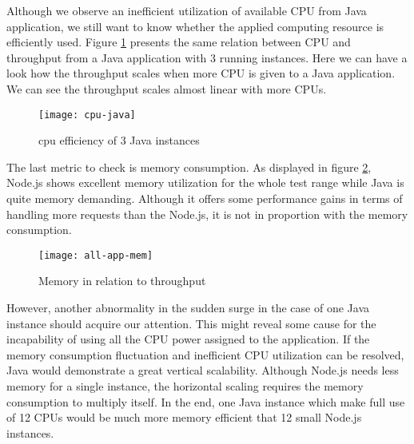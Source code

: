 Although we observe an inefficient utilization of available CPU from Java application, we still want to know whether the applied computing resource is efficiently used. Figure \ref{cpu-java} presents the same relation between CPU and throughput from a Java application with 3 running instances. Here we can have a look how the throughput scales when more CPU is given to a Java application. We can see the throughput scales almost linear with more CPUs.
 \begin{figure}[h]
	\centering
	\texttt{[image: cpu-java]}
	\caption{cpu efficiency of 3 Java instances}
	\label{cpu-java}
\end{figure}

The last metric to check is memory consumption. As displayed in figure \ref{all-app-memory}, Node.js shows excellent memory utilization for the whole test range while Java is quite memory demanding. Although it offers some performance gains in terms of handling more requests than the Node.js, it is not in proportion with the memory consumption. \\

 \begin{figure}[h]
	\centering
	\texttt{[image: all-app-mem]}
	\caption{Memory in relation to throughput}
	\label{all-app-memory}
\end{figure}

However, another abnormality in the sudden surge in the case of one Java instance should acquire our attention. This might reveal some cause for the incapability of using all the CPU power assigned to the application. If the memory consumption fluctuation and inefficient CPU utilization can be resolved,  Java would demonstrate a great vertical scalability. Although Node.js needs less memory for a single instance, the horizontal scaling requires the memory consumption to multiply itself. In the end, one Java instance which make full use of 12 CPUs would be much more memory efficient that 12 small Node.js instances. 